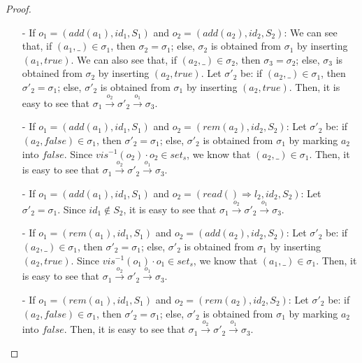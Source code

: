 {\begin {proof}
\begin{itemize}
\setlength{\itemsep}{0.5pt}
\item[-] If $o_1 = (\mathit{add}(a_1),\mathit{id}_1,S_1)$ and $o_2 = (\mathit{add}(a_2),\mathit{id}_2,S_2)$: We can see that, if $(a_1,\_) \in \sigma_1$, then $\sigma_2 = \sigma_1$; else, $\sigma_2$ is obtained from $\sigma_1$ by inserting $(a_1,\mathit{true})$. We can also see that, if $(a_2,\_) \in \sigma_2$, then $\sigma_3 = \sigma_2$; else, $\sigma_3$ is obtained from $\sigma_2$ by inserting $(a_2,\mathit{true})$. Let $\sigma'_2$ be: if $(a_2,\_) \in \sigma_1$, then $\sigma'_2 = \sigma_1$; else, $\sigma'_2$ is obtained from $\sigma_1$ by inserting $(a_2,\mathit{true})$. Then, it is easy to see that $\sigma_1 {\xrightarrow{o_2}} \sigma'_2 {\xrightarrow{o_1}} \sigma_3$.

\item[-] If $o_1 = (\mathit{add}(a_1),\mathit{id}_1,S_1)$ and $o_2 = (\mathit{rem}(a_2),\mathit{id}_2,S_2)$: Let $\sigma'_2$ be: if $(a_2,\mathit{false}) \in \sigma_1$, then $\sigma'_2 = \sigma_1$; else, $\sigma'_2$ is obtained from $\sigma_1$ by marking $a_2$ into $\mathit{false}$. Since $\mathit{vis}^{-1}(o_2) \cdot o_2 \in \mathit{set}_s$, we know that $(a_2,\_) \in \sigma_1$. Then, it is easy to see that $\sigma_1 {\xrightarrow{o_2}} \sigma'_2 {\xrightarrow{o_1}} \sigma_3$.

\item[-] If $o_1 = (\mathit{add}(a_1),\mathit{id}_1,S_1)$ and $o_2 = (\mathit{read}() \Rightarrow l_2,\mathit{id}_2,S_2)$: Let $\sigma'_2 = \sigma_1$. Since $\mathit{id}_1 \notin S_2$, it is easy to see that $\sigma_1 {\xrightarrow{o_2}} \sigma'_2 {\xrightarrow{o_1}} \sigma_3$.

\item[-] If $o_1 = (\mathit{rem}(a_1),\mathit{id}_1,S_1)$ and $o_2 = (\mathit{add}(a_2),\mathit{id}_2,S_2)$: Let $\sigma'_2$ be: if $(a_2,\_) \in \sigma_1$, then $\sigma'_2 = \sigma_1$; else, $\sigma'_2$ is obtained from $\sigma_1$ by inserting $(a_2,\mathit{true})$. Since $\mathit{vis}^{-1}(o_1) \cdot o_1 \in \mathit{set}_s$, we know that $(a_1,\_) \in \sigma_1$. Then, it is easy to see that $\sigma_1 {\xrightarrow{o_2}} \sigma'_2 {\xrightarrow{o_1}} \sigma_3$.

\item[-] If $o_1 = (\mathit{rem}(a_1),\mathit{id}_1,S_1)$ and $o_2 = (\mathit{rem}(a_2),\mathit{id}_2,S_2)$: Let $\sigma'_2$ be: if $(a_2,\mathit{false}) \in \sigma_1$, then $\sigma'_2 = \sigma_1$; else, $\sigma'_2$ is obtained from $\sigma_1$ by marking $a_2$ into $\mathit{false}$. Then, it is easy to see that $\sigma_1 {\xrightarrow{o_2}} \sigma'_2 {\xrightarrow{o_1}} \sigma_3$.


\end{itemize}
\end{proof}}
